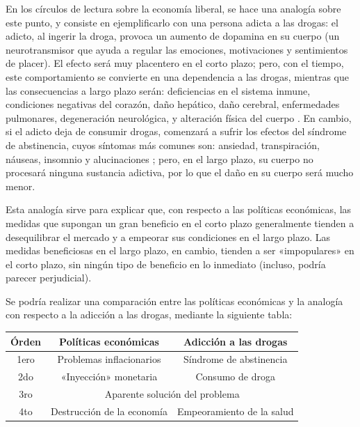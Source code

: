 \documentclass[12pt,a4paper,twoside]{book}
\begin{document}
En los círculos de lectura sobre la economía liberal, se hace una analogía sobre este punto, y consiste en ejemplificarlo con una persona adicta a las drogas: el adicto, al ingerir la droga, provoca un aumento de dopamina en su cuerpo (un neurotransmisor que ayuda a regular las emociones, motivaciones y sentimientos de placer). El efecto será muy placentero en el corto plazo; pero, con el tiempo, este comportamiento se convierte en una dependencia a las drogas, mientras que las consecuencias a largo plazo serán: deficiencias en el sistema inmune, condiciones negativas del corazón, daño hepático, daño cerebral, enfermedades pulmonares, degeneración neurológica, y alteración física del cuerpo \cite{problemas-droga}. En cambio, si el adicto deja de consumir drogas, comenzará a sufrir los efectos del síndrome de abstinencia, cuyos síntomas más comunes son: ansiedad, transpiración, náuseas, insomnio y alucinaciones \cite{abstinencia}; pero, en el largo plazo, su cuerpo no procesará ninguna sustancia adictiva, por lo que el daño en su cuerpo será mucho menor.

Esta analogía sirve para explicar que, con respecto a las políticas económicas, las medidas que supongan un gran beneficio en el corto plazo generalmente tienden a desequilibrar el mercado y a empeorar sus condiciones en el largo plazo. Las medidas beneficiosas en el largo plazo, en cambio, tienden a ser «impopulares» en el corto plazo, sin ningún tipo de beneficio en lo inmediato (incluso, podría parecer perjudicial). 

Se podría realizar una comparación entre las políticas económicas y la analogía con respecto a la adicción a las drogas, mediante la siguiente tabla:

\begin{center}
\begin{tabular}{|c|c|c|}
\hline 
\textbf{Órden} & \textbf{Políticas económicas} & \textbf{Adicción a las drogas} \\ 
\hline 
1ero & Problemas inflacionarios & Síndrome de abstinencia \\ 
\hline 
2do & «Inyección» monetaria & Consumo de droga \\ 
\hline 
3ro & \multicolumn{2}{|c|}{Aparente solución del problema} \\ 
\hline 
4to & Destrucción de la economía & Empeoramiento de la salud \\ 
\hline 
\end{tabular} 
\end{center}
\end{document}
